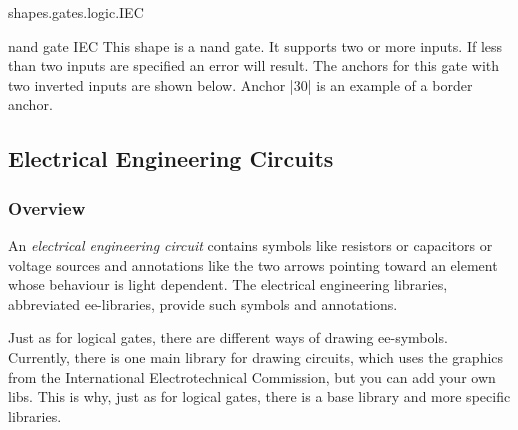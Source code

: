 \begin{pgflibrary}{shapes.gates.logic.IEC}
    \begin{shape}{nand gate IEC}
        This shape is a nand gate. It supports two or more inputs. If less than
        two inputs are specified an error will result. The anchors for this
        gate with two inverted inputs are shown below. Anchor |30| is an
        example of a border anchor.
\begin{codeexample}[preamble={\usetikzlibrary{circuits.logic.IEC}}]
\Huge
{}
\end{codeexample}
    \end{shape}
\end{pgflibrary}


\subsection{Electrical Engineering Circuits}

\subsubsection{Overview}

An \emph{electrical engineering circuit} contains symbols like resistors or
capacitors or voltage sources and annotations like the two arrows pointing
toward an element whose behaviour is light dependent. The electrical
engineering libraries, abbreviated ee-libraries, provide such symbols and
annotations.

Just as for logical gates, there are different ways of drawing ee-symbols.
Currently, there is one main library for drawing circuits, which uses the
graphics from the International Electrotechnical Commission, but you can add
your own libs. This is why, just as for logical gates, there is a base library
and more specific libraries.

